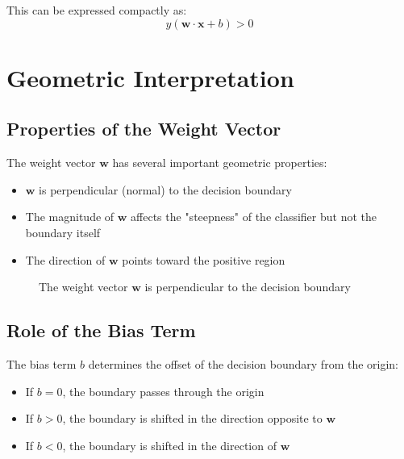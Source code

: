 \documentclass{article}
\begin{document}
This can be expressed compactly as:
\[
y(\mathbf{w} \cdot \mathbf{x} + b) > 0
\]

\section{Geometric Interpretation}

\subsection{Properties of the Weight Vector}
The weight vector $\mathbf{w}$ has several important geometric properties:
\begin{itemize}
    \item $\mathbf{w}$ is perpendicular (normal) to the decision boundary
    \item The magnitude of $\mathbf{w}$ affects the "steepness" of the classifier but not the boundary itself
    \item The direction of $\mathbf{w}$ points toward the positive region
\end{itemize}

\begin{figure}[h]
\centering
{}
\caption{The weight vector $\mathbf{w}$ is perpendicular to the decision boundary}
\end{figure}

\subsection{Role of the Bias Term}
The bias term $b$ determines the offset of the decision boundary from the origin:
\begin{itemize}
    \item If $b = 0$, the boundary passes through the origin
    \item If $b > 0$, the boundary is shifted in the direction opposite to $\mathbf{w}$
    \item If $b < 0$, the boundary is shifted in the direction of $\mathbf{w}$
\end{itemize}
\end{document}
